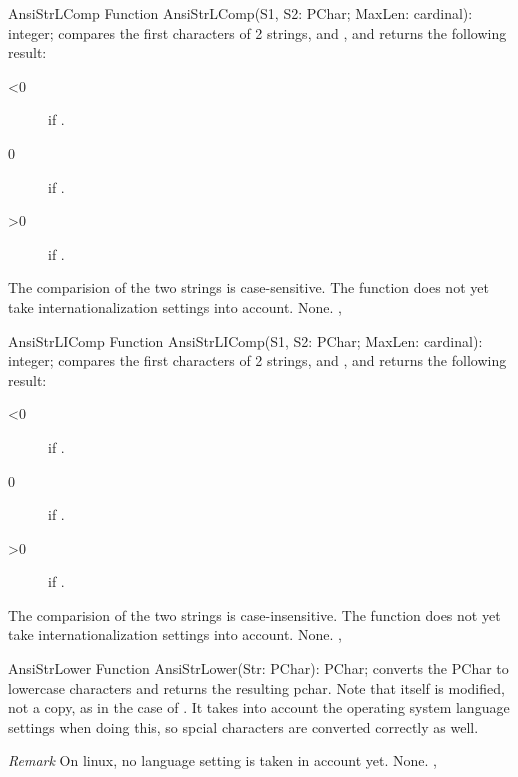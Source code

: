 

\begin{function}{AnsiStrLComp}
\Declaration
Function AnsiStrLComp(S1, S2: PChar; MaxLen: cardinal): integer;
\Description
{} compares the first  characters of
2  strings,  and , and returns the following
result:
\begin{description}
\item[<0]  if .
\item[0]  if .
\item[>0]  if .
\end{description}
The comparision of the two strings is case-sensitive.
The function does not yet take internationalization settings into account.
\Errors
None.
\SeeAlso
{}, 
\end{function}



\begin{function}{AnsiStrLIComp}
\Declaration
Function AnsiStrLIComp(S1, S2: PChar; MaxLen: cardinal): integer;
\Description
{} compares the first  characters of
2  strings,  and , and returns the following
result:
\begin{description}
\item[<0]  if .
\item[0]  if .
\item[>0]  if .
\end{description}
The comparision of the two strings is case-insensitive.
The function does not yet take internationalization settings into account.
\Errors
None.
\SeeAlso
{}, 
\end{function}





\begin{function}{AnsiStrLower}
\Declaration
Function AnsiStrLower(Str: PChar): PChar;
\Description
{} converts the PChar  to lowercase characters
and returns the resulting pchar. Note that  itself is modified,
not a copy, as in the case of .
It takes into account the operating system language
settings when doing this, so spcial characters are converted correctly as
well.

{\em Remark} On linux, no language setting is taken in account yet.
\Errors
None.
\SeeAlso
{}, 
\end{function}

